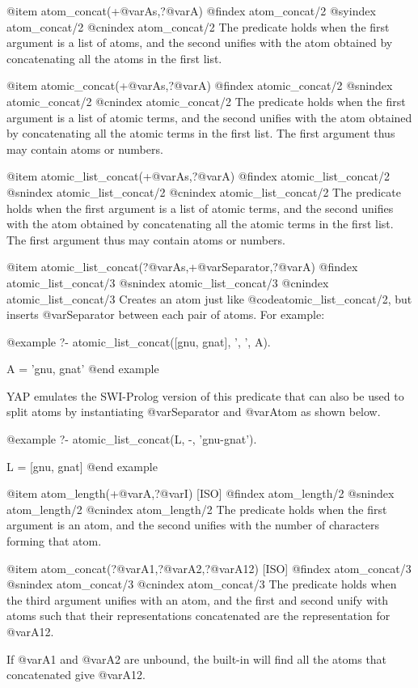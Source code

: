 {{{{@item atom_concat(+@var{As},?@var{A})
@findex atom_concat/2
@syindex atom_concat/2
@cnindex atom_concat/2
The predicate holds when the first argument is a list of atoms, and the
second unifies with the atom obtained by concatenating all the atoms in
the first list.

@item atomic_concat(+@var{As},?@var{A})
@findex atomic_concat/2
@snindex atomic_concat/2
@cnindex atomic_concat/2
The predicate holds when the first argument is a list of atomic terms, and
the second unifies with the atom obtained by concatenating all the
atomic terms in the first list. The first argument thus may contain
atoms or numbers.

@item atomic_list_concat(+@var{As},?@var{A})
@findex atomic_list_concat/2
@snindex atomic_list_concat/2
@cnindex atomic_list_concat/2
The predicate holds when the first argument is a list of atomic terms, and
the second unifies with the atom obtained by concatenating all the
atomic terms in the first list. The first argument thus may contain
atoms or numbers.

@item atomic_list_concat(?@var{As},+@var{Separator},?@var{A})
@findex atomic_list_concat/3
@snindex atomic_list_concat/3
@cnindex atomic_list_concat/3
Creates an atom just like @code{atomic_list_concat/2}, but inserts
@var{Separator} between each pair of atoms. For example:

@example
?- atomic_list_concat([gnu, gnat], ', ', A).

A = 'gnu, gnat'
@end example

YAP emulates the SWI-Prolog version of this predicate that can also be
used to split atoms by instantiating @var{Separator} and @var{Atom} as
shown below.

@example
?- atomic_list_concat(L, -, 'gnu-gnat').

L = [gnu, gnat]
@end example

@item atom_length(+@var{A},?@var{I}) [ISO]
@findex atom_length/2
@snindex atom_length/2
@cnindex atom_length/2
The predicate holds when the first argument is an atom, and the second
unifies with the number of characters forming that atom.

@item atom_concat(?@var{A1},?@var{A2},?@var{A12}) [ISO]
@findex atom_concat/3
@snindex atom_concat/3
@cnindex atom_concat/3
The predicate holds when the third argument unifies with an atom, and
the first and second unify with atoms such that their representations
concatenated are the representation for @var{A12}.

If @var{A1} and @var{A2} are unbound, the built-in will find all the atoms
that concatenated give @var{A12}.

}}}}
